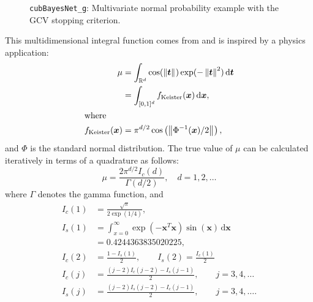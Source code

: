 \documentclass{iitthesis}          %
\newcommand{\bm}[1]{\boldsymbol{#1}}
\newcommand{\dif}[1]{\text{d}{#1}}
\newcommand{\reals}{\mathbb{R}}
\newcommand{\vt}{\bm{t}}
\newcommand{\vx}{\bm{x}}
\newcommand{\dvx}{\dif{\bm{x}}}
\newcommand{\dvt}{\dif{\bm{t}}}
\newcommand{\code}[1]{\texttt{#1}}
\newcommand{\norm}[2][{}]{\ensuremath{\left \lVert #2 \right \rVert}_{#1}}
\begin{document}
{{{{{{\begin{figure}
\caption[Sobol: MVN guaranteed: GCV]{\code{cubBayesNet\_g}: Multivariate normal probability example with the GCV stopping criterion.}
\label{fig:Sobol-mvn-guaranteed-GCV}
\end{figure}







This multidimensional integral function comes from \cite{Kei96} and is inspired by a physics application:
\begin{align}
\label{eqn:keister_integral}
\mu & =  \int_{\reals^d} \cos(\norm{ \vt}) \exp(-\norm{ \vt }^2) \, \dvt \\
\nonumber
& = \int_{[0,1]^d} f_{\textup{Keister}}(\vx) \, \dvx,\\
\intertext{where }
\nonumber
f_\textup{Keister}(\vx) &= \pi^{d/2} \cos\left(\norm{ \Phi^{-1}(\vx)/2}\right)  ,
\end{align}
and $\Phi$ is the standard normal distribution.
The true value of $\mu$ can be calculated iteratively in terms of a quadrature as follows:  
\begin{equation*}
\mu = \frac{2 \pi^{d/2} I_c(d)}{\Gamma(d/2)}, \quad d=1,2, \ldots
\end{equation*}
where $\Gamma$ denotes the gamma function, and
\begin{align*}
I_c(1) &= \frac{\sqrt{\pi}}{2 \exp(1/4)}, 
\\
I_s(1) &= \int_{x=0}^\infty \exp(-\vx^T\vx)\sin(\vx) \, \dvx 
\\
& =  0.4244363835020225,
\\
I_c(2) &= \frac{1-I_s(1)}{2}, \qquad
I_s(2) = \frac{I_c(1)}{2}
\\
I_c(j) &= \frac{(j-2)I_c(j-2)-I_s(j-1)}{2},
\qquad j =3,4,\ldots
\\
I_s(j) &= \frac{(j-2)I_s(j-2)-I_c(j-1)}{2},
\qquad j =3,4,\ldots.
\end{align*}

}}}}}}
\end{document}
